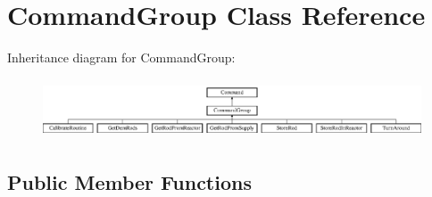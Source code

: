 \hypertarget{classCommandGroup}{\section{Command\-Group Class Reference}
\label{classCommandGroup}
}
Inheritance diagram for Command\-Group\-:\begin{figure}[H]
\begin{center}
\leavevmode
\includegraphics[height=1.791045cm]{classCommandGroup}
\end{center}
\end{figure}
\subsection*{Public Member Functions}
